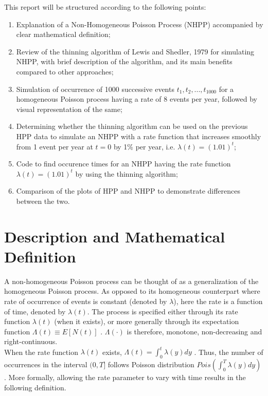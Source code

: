 \documentclass[%
 reprint,
 amsmath,amssymb,
 aps,
]{revtex4-2}
\theoremstyle{definition}
\begin{document}
This report will be structured according to the following points:
\begin{enumerate}
\item Explanation of a Non-Homogeneous Poisson Process (NHPP) accompanied by clear mathematical definition;
\item Review of the thinning algorithm of Lewis and Shedler, 1979 \cite{lewis_shedler_1979} for simulating NHPP, with brief description of the algorithm, and its main benefits compared to other approaches;
\item Simulation of occurrence of 1000 successive events ${t_1, t_2, . . . , t_{1000}}$ for a homogeneous Poisson process having a rate of 8 events per year, followed by visual representation of the same;

\item Determining whether the thinning algorithm can be used on the previous HPP data to simulate an NHPP with a rate function that increases smoothly from 1 event per year at $t = 0$ by 1\% per year, i.e. $\lambda(t) = (1.01)^t$;
\item Code to find occurence times for an NHPP having the rate function $\lambda(t) = (1.01)^t$ by using the thinning algorithm;
\item Comparison of the plots of HPP and NHPP to demonstrate differences between the two.

\end{enumerate}

\section{\label{q:1}Description and Mathematical Definition}
A non-homogeneous Poisson process can be thought of as a generalization of the homogeneous Poisson process. As opposed to its homogeneous counterpart where rate of occurrence of events is constant (denoted by $\lambda$), here the rate is a function of time, denoted by $\lambda(t)$. The process is specified either through its rate function $\lambda(t)$ (when it exists), or more generally through its expectation function $\Lambda(t) \equiv  E[N(t)]$ \cite{pasupathy}. $\Lambda(\cdot)$ is therefore, monotone, non-decreasing and right-continuous. \\

When the rate function $\lambda(t)$ exists, $\Lambda(t) = \int_{0}^{t}\lambda(y) dy$ \cite{pasupathy}. Thus, the number of occurrences in the interval $(0,T]$ follows Poisson distribution $Pois(\int_{0}^{T}\lambda(y)dy)$ \cite{chen}. More formally, allowing the rate parameter to vary with time results in the following definition.
\end{document}
